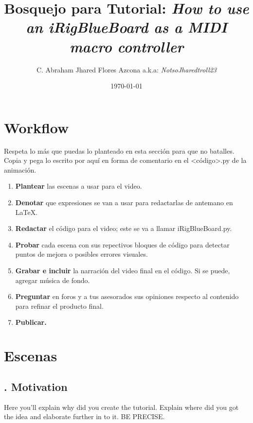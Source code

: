 \documentclass[letterpaper, 12pt]{article}
\title{Bosquejo para \textbf{Tutorial:} 
    {\fontfamily{qag}\selectfont
        \emph{How to use an iRigBlueBoard as a MIDI macro controller}
    }
}
\author{C. Abraham Jhared Flores Azcona a.k.a: \emph{NotsoJharedtroll23}}
\date{\today}
\begin{document}
\maketitle
\thispagestyle{empty}
\section*{Workflow}
\justify
Respeta lo más que puedas lo planteado en esta sección para que no batalles. Copia y pega lo escrito por aquí en forma de comentario en el {\selectfont<código>.py} de la animación.
    \begin{enumerate}
        \item \textbf{Plantear} las escenas a usar para el video.
        \item \textbf{Denotar} que expresiones se van a usar para redactarlas de antemano en \LaTeX.
        \item \textbf{Redactar} el código para el video; este se va a llamar {\selectfont iRigBlueBoard.py}.
        \item \textbf{Probar} cada escena con sus repectivos bloques de código para detectar puntos de mejora o posibles errores visuales.
        \item \textbf{Grabar e incluir} la narración del video final en el código. Si se puede, agregar música de fondo.
        \item \textbf{Preguntar} en foros y a tus asesorados sus opiniones respecto al contenido para refinar el producto final.
        \item \textbf{Publicar.}
    \end{enumerate}

\section*{Escenas}
\subsection*{{. Motivation}} \justify
Here you'll explain why did you create the tutorial. Explain where did you got the idea and elaborate further in to it. BE PRECISE.
\end{document}
